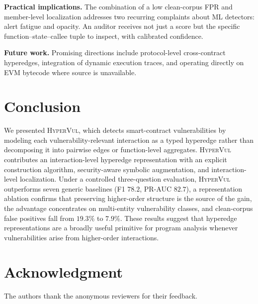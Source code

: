 \documentclass[conference]{IEEEtran}
\newcommand{\hypervul}{\textsc{HyperVul}}
\begin{document}
\noindent\textbf{Practical implications.} The combination of a low clean-corpus FPR
and member-level localization addresses two recurring complaints about ML detectors:
alert fatigue and opacity. An auditor receives not just a score but the specific
function--state--callee tuple to inspect, with calibrated confidence.

\noindent\textbf{Future work.} Promising directions include protocol-level
cross-contract hyperedges, integration of dynamic execution traces, and operating
directly on EVM bytecode where source is unavailable.

\section{Conclusion}
\label{sec:conclusion}

We presented \hypervul{}, which detects smart-contract vulnerabilities by modeling
each vulnerability-relevant interaction as a typed hyperedge rather than decomposing
it into pairwise edges or function-level aggregates. \hypervul{} contributes an
interaction-level hyperedge representation with an explicit construction algorithm,
security-aware symbolic augmentation, and interaction-level localization. Under a
controlled three-question evaluation, \hypervul{} outperforms seven generic baselines
(F1 $78.2$, PR-AUC $82.7$), a representation ablation confirms that preserving
higher-order structure is the source of the gain, the advantage concentrates on
multi-entity vulnerability classes, and clean-corpus false positives fall from
$19.3\%$ to $7.9\%$. These results suggest that hyperedge representations are a broadly
useful primitive for program analysis whenever vulnerabilities arise from higher-order
interactions.

\section*{Acknowledgment}
The authors thank the anonymous reviewers for their feedback.
\end{document}
